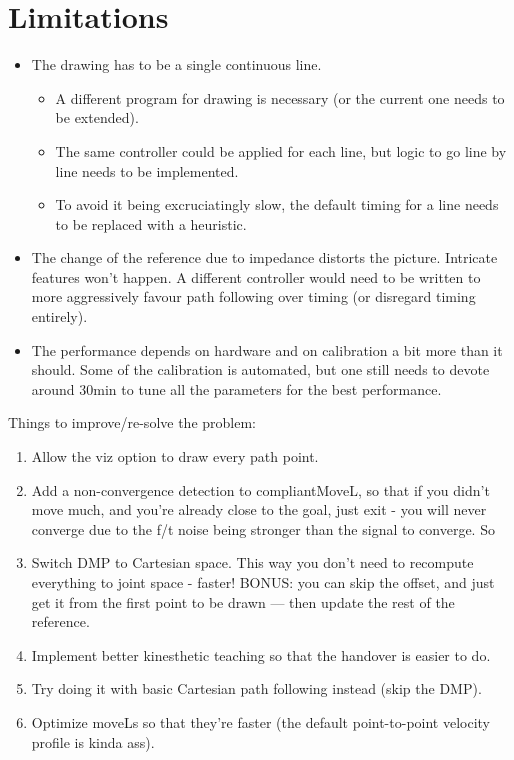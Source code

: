 \documentclass{article}
\begin{document}
\section{Limitations}
\begin{itemize}
		\item The drawing has to be a single continuous line. 
				\begin{itemize}
						\item A different program for drawing is necessary (or the current one needs to be extended).
						\item The same controller could be applied for each line, but logic to go line by line
								needs to be implemented. 
						\item To avoid it being excruciatingly slow, the default timing for a line needs
								to be replaced with a heuristic.
				\end{itemize}
		\item The change of the reference due to impedance distorts the picture. Intricate features
				won't happen. A different controller would need to be written to more aggressively favour
				path following over timing (or disregard timing entirely).
		\item The performance depends on hardware and on calibration a bit more than it should.
				Some of the calibration is automated, but one still needs to devote around 30min
				to tune all the parameters for the best performance.
\end{itemize}


Things to improve/re-solve the problem:
\begin{enumerate}
		\item Allow the viz option to draw every path point.
		\item Add a non-convergence detection to compliantMoveL, so that if you didn't move much,
				and you're already close to the goal, just exit - you will never converge 
				due to the f/t noise being stronger than the signal to converge.
				So 
		\item Switch DMP to Cartesian space. This way you don't need to 
				recompute everything to joint space - faster!
		        BONUS: you can skip the offset, and just get it from the first
				point to be drawn --- then update the rest of the reference.
		\item Implement better kinesthetic teaching so that the handover is easier to do.
		\item Try doing it with basic Cartesian path following instead (skip the DMP).
		\item Optimize moveLs so that they're faster (the default point-to-point
				velocity profile is kinda ass).
\end{enumerate}
\end{document}
